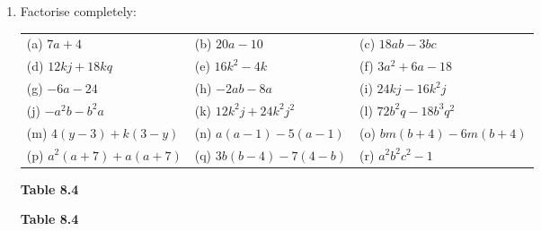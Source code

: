 \begin{enumerate}[noitemsep, label=\textbf{\arabic*}. ]
        \newline
\newline
        \label{m39383*uid16}\item Factorise completely:
          \begin{table}[H]
        \begin{center}
      \label{m39383*id270628}
    \noindent
      \tablelasttail{}
      \begin{xtabular}[t]{|l|l|l|}\hline
        (a) $7a+4$ &
        (b) $20a-10$ &
        (c) $18ab-3bc$%
     \tabularnewline{}
        (d) $12kj+18kq$ &
        (e) $16{k}^{2}-4k$ &
        (f) $3{a}^{2}+6a-18$%
     \tabularnewline{}
        (g) $-6a-24$ &
        (h) $-2ab-8a$ &
        (i) $24kj-16{k}^{2}j$%
     \tabularnewline{}
        (j) $-{a}^{2}b-{b}^{2}a$ &
        (k) $12{k}^{2}j+24{k}^{2}{j}^{2}$ &
        (l) $72{b}^{2}q-18{b}^{3}{q}^{2}$%
     \tabularnewline{}
        (m) $4\left(y-3\right)+k\left(3-y\right)$ &
        (n) $a\left(a-1\right)-5\left(a-1\right)$ &
        (o) $bm\left(b+4\right)-6m\left(b+4\right)$%
     \tabularnewline{}
        (p) ${a}^{2}\left(a+7\right)+a\left(a+7\right)$ &
        (q) $3b\left(b-4\right)-7\left(4-b\right)$ &
        (r) ${a}^{2}{b}^{2}{c}^{2}-1$%
     \tabularnewline{}
    \end{xtabular}
      \end{center}
    \begin{center}{\small\bfseries Table 8.4}\end{center}
    \begin{caption}{\small\bfseries Table 8.4}\end{caption}
\end{table}
    \par
  \newline
\newline
        \end{enumerate}
